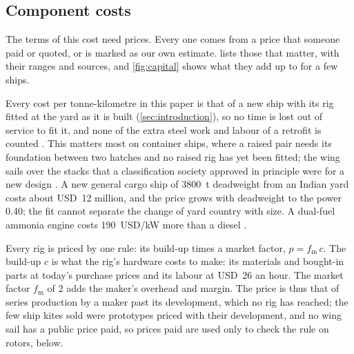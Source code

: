 \subsection{Component costs}
\label{sec:costs}

The terms of this cost need prices. Every one comes from a price that someone paid or quoted, or is marked as our own estimate.  lists those that matter, with their ranges and sources, and \cref{fig:capital} shows what they add up to for a few ships.

Every cost per tonne-kilometre in this paper is that of a new ship with its rig fitted at the yard as it is built (\cref{sec:introduction}), so no time is lost out of service to fit it, and none of the extra steel work and labour of a retrofit is counted \citep{emsa2023}. This matters most on container ships, where a raised pair needs its foundation between two hatches and no raised rig has yet been fitted; the wing sails over the stacks that a classification society approved in principle were for a new design \citep[p.~34]{emsa2023}. A new general cargo ship of \num{3800}~t deadweight from an Indian yard costs about USD~12 million, and the price grows with deadweight to the power 0.40; the fit cannot separate the change of yard country with size. A dual-fuel ammonia engine costs \SI{190}{USD/kW} more than a diesel \citep{lrumas2020}.

Every rig is priced by one rule: its build-up times a market factor, $p = f_\mathrm{m}\,c$. The build-up $c$ is what the rig's hardware costs to make: its materials and bought-in parts at today's purchase prices and its labour at USD~26 an hour. The market factor $f_\mathrm{m}$ of 2 adds the maker's overhead and margin. The price is thus that of series production by a maker past its development, which no rig has reached; the few ship kites sold were prototypes priced with their development, and no wing sail has a public price paid, so prices paid are used only to check the rule on rotors, below.

